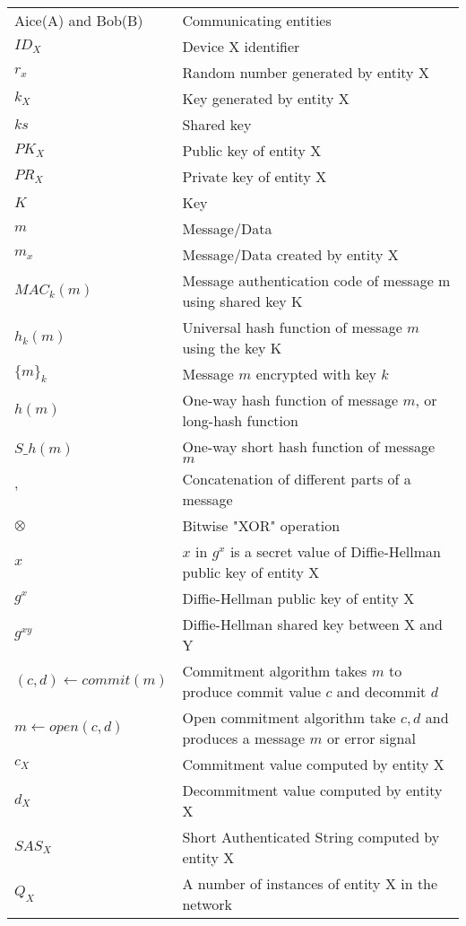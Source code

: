 \begin{longtable}[l]{p{100pt} p{250pt}}
Aice(A) and Bob(B) & Communicating entities \\ 
$ID_X$ & Device X identifier \\ 
$r_x$ & Random number generated by entity X \\
$k_X$ & Key generated by entity X \\
$ks$ & Shared key \\
$PK_X$ & Public key of entity X \\ 
$PR_X$ & Private key of entity X \\
$K$ & Key \\
$m$ & Message/Data \\ 
$m_x$ & Message/Data created by entity X \\ 
$MAC_k(m)$ & Message authentication code of message m using shared key K \\ 
$h_k(m)$ & Universal hash function of message $m$ using the key K \\ 
$\{m\}_k$ & Message $m$ encrypted with key $k$ \\  
$h(m)$ & One-way hash function of message $m$, or long-hash function \\ 
$S\_h(m)$ & One-way short hash function of message $m$ \\
$,$ & Concatenation of different parts of a message\\ 
$\otimes$ & Bitwise "XOR" operation \\ 
$x$ & $x$ in $g^x$ is a secret value of Diffie-Hellman public key of entity X \\ 
$g^x$ & Diffie-Hellman public key of entity X \\ 
$g^{xy}$ & Diffie-Hellman shared key between X and Y \\ 
$(c,d) \leftarrow commit(m)$ & Commitment algorithm takes $m$ to produce commit value $c$ and decommit $d$ \\ 
$m \leftarrow open(c,d)$ & Open commitment algorithm take $c,d$ and produces a message $m$ or error signal \\ 
$c_X$ & Commitment value computed by entity X \\
$d_X$ & Decommitment value computed by entity X \\
$SAS_X$ & Short Authenticated String computed by entity X \\ 
 $Q_X$ & A number of instances of entity X in the network \\ 


\end{longtable}
